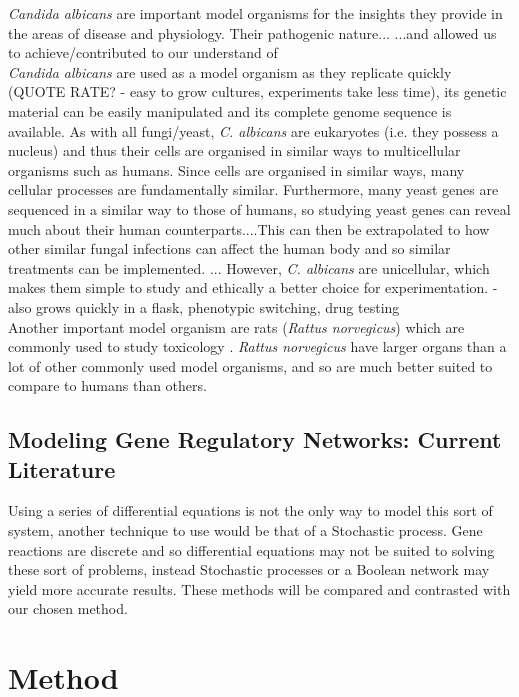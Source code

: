 \documentclass[]{article}
\begin{document}
\textit{Candida albicans} are important model organisms for the insights they provide in the areas of disease and physiology. Their pathogenic nature... %
...and allowed us to achieve/contributed to our understand of %
\\
\textit{Candida albicans} are used as a model organism as they replicate quickly (QUOTE RATE? - easy to grow cultures, experiments take less time), its genetic material can be easily manipulated and its complete genome sequence is available\cite{kabir2012candida}. As with all fungi/yeast, \textit{C. albicans} are eukaryotes (i.e. they possess a nucleus) and thus their cells are organised in similar ways to multicellular organisms such as humans. %
Since cells are organised in similar ways, many cellular processes are fundamentally similar. Furthermore, many yeast genes are sequenced in a similar way to those of humans, so studying yeast genes can reveal much about their human counterparts....This can then be extrapolated to how other similar fungal infections can affect the human body and so similar treatments can be implemented. ... However, \textit{C. albicans} are unicellular, which makes them simple to study and ethically a better choice for experimentation. 
- also grows quickly in a flask, phenotypic switching, drug testing
\\
Another important model organism are rats (\textit{Rattus norvegicus}) which are commonly used to study toxicology \cite{athanazio2008rattus}. \textit{Rattus norvegicus} have larger organs than a lot of other commonly used model organisms, and so are much better suited to compare to humans than others.

   \subsection{Modeling Gene Regulatory Networks: Current Literature}
Using a series of differential equations is not the only way to model this sort of system, another technique to use would be that of a Stochastic process. Gene reactions are discrete and so differential equations may not be suited to solving these sort of problems, instead Stochastic processes or a Boolean network may yield more accurate results. These methods will be compared and contrasted with our chosen method.%
\pagebreak

\section{Method}
\end{document}
